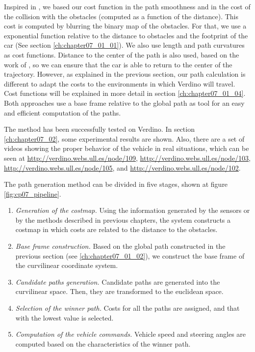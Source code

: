 Inspired in \cite{chu2012local}, we based our cost function in the path smoothness and in the cost of the collision with the obstacles (computed as a function of the distance). This cost is computed by blurring the binary map of the obstacles. For that, we use a exponential function relative to the distance to obstacles and the footprint of the car (See section \ref{ch:chapter07_01_01}).
We also use length and path curvatures as cost functions. Distance to the center of the path is also used, based on the work of \cite{thrun2006stanley}, so we can ensure that the car is able to return to the center of the trajectory. However, as explained in the previous section, our path calculation is different to adapt the costs to the environments in which Verdino will travel. Cost functions will be explained in more detail in section \ref{ch:chapter07_01_04}. Both approaches \citep{chu2012local, thrun2006stanley} use a base frame relative to the global path as tool for an easy and efficient computation of the paths.

The method has been successfully tested on Verdino. In section \ref{ch:chapter07_02}, some experimental results are shown. Also, there are a set of videos showing the proper behavior of the vehicle in real situations, which can be seen at \url{http://verdino.webs.ull.es/node/109}, \url{http://verdino.webs.ull.es/node/103}, \url{http://verdino.webs.ull.es/node/105}, and \url{http://verdino.webs.ull.es/node/102}.

The path generation method can be divided in five stages, shown at figure \ref{fig:cp07_pipeline}.
\begin{enumerate}
 \item \emph{Generation of the costmap.} Using the information generated by the sensors or by the methods described in previous chapters, the system constructs a costmap in which costs are related to the distance to the obstacles.
 \item \emph{Base frame construction.} Based on the global path constructed in the previous section (see \ref{ch:chapter07_01_02}), we construct the base frame of the curvilinear coordinate system.
 \item \emph{Candidate paths generation.} Candidate paths are generated into the curvilinear space. Then, they are transformed to the euclidean space.
 \item \emph{Selection of the winner path.} Costs for all the paths are assigned, and that with the lowest value is selected.
 \item \emph{Computation of the vehicle commands.} Vehicle speed and steering angles are computed based on the characteristics of the winner path.
\end{enumerate}

